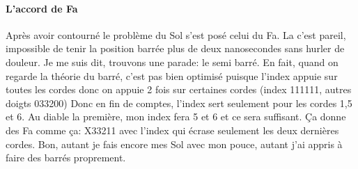 \documentclass[a4paper,twoside]{article}
\begin{document}
\paragraph{L'accord de Fa}
Après avoir contourné le problème du Sol s'est posé celui du Fa. La
c'est pareil, impossible de tenir la position barrée plus de deux
nanosecondes sans hurler de douleur.  Je me suis dit, trouvons une parade:
le semi barré.  En fait, quand on regarde la théorie du barré, c'est
pas bien optimisé puisque l'index appuie sur toutes les cordes donc on
appuie 2 fois sur certaines cordes (index 111111, autres doigts 033200)
Donc en fin de comptes, l'index sert seulement pour les cordes 1,5 et
6. Au diable la première, mon index fera 5 et 6 et ce sera suffisant.
Ça donne des Fa comme ça: X33211 avec l'index qui écrase seulement les
deux dernières cordes. Bon, autant je fais encore mes Sol avec mon
pouce, autant j'ai appris à faire des barrés proprement.
\end{document}
